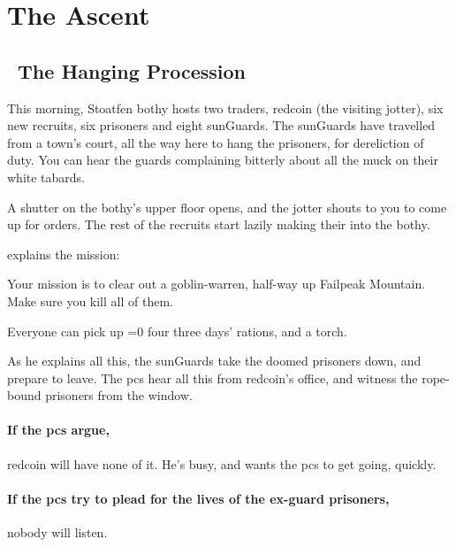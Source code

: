 \section{The Ascent}

\begin{multicols}{2}


\subsection[The Hanging Procession]{~The Hanging Procession~}

\begin{boxtext}
  This morning, Stoatfen \gls{bothy} hosts two traders, \gls{redcoin} (the visiting \gls{jotter}), six new recruits, six prisoners and eight \glspl{sunGuard}.
  The \glspl{sunGuard} have travelled from a town's \gls{court}, all the way here to hang the prisoners, for dereliction of duty.
  You can hear the guards complaining bitterly about all the muck on their white tabards.

  A shutter on the \gls{bothy}'s upper floor opens, and the \gls{jotter} shouts to you to come up for orders.
  The rest of the recruits start lazily making their into the \gls{bothy}.
\end{boxtext}

 explains the mission:

\begin{exampletext}
  Your mission is to clear out a goblin-warren, half-way up Failpeak Mountain.
  Make sure you kill all of them.

  Everyone can pick up \ifnum\value{temperature}=0 four \else three \fi days' rations, and a torch.
\end{exampletext}

\noindent
As he explains all this, the \glspl{sunGuard} take the doomed prisoners down, and prepare to leave.
The \glspl{pc} hear all this from \gls{redcoin}'s office, and witness the rope-bound prisoners from the window.


\paragraph{If the \glspl{pc} argue,}
\gls{redcoin} will have none of it.
He's busy, and wants the \glspl{pc} to get going, quickly.

\paragraph{If the \glspl{pc} try to plead for the lives of the ex-\gls{guard} prisoners,}
nobody will listen.


\end{multicols}
